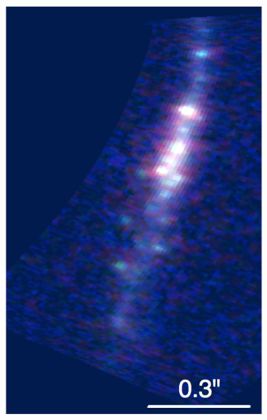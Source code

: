 \begin{figure}
\centering
\includegraphics[height=0.4\textheight]{Conclusion/candelized_highres.png}

\end{figure}
